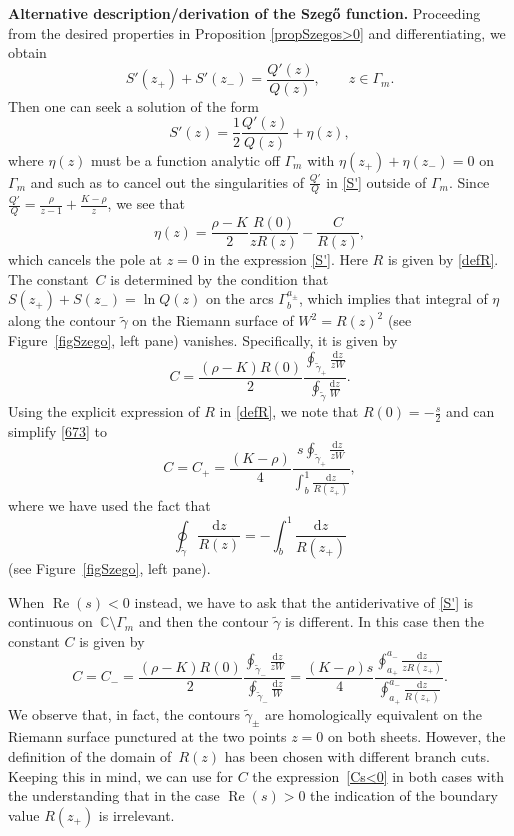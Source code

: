 \documentclass[pdftex]{sigma}
\numberwithin{equation}{section}
\theoremstyle{definition}
\def \wt{ \widetilde }
\def \d{{\mathrm d}}
\def\be{\begin{equation}}
\def\ee{\end{equation}}
\def\C{{\mathbb C}}
\def \Re{\operatorname{Re} }
\def\la{\label}
\begin{document}
{\bf Alternative description/derivation of the Szeg\H{o} function.}
Proceeding from the desired properties in Proposition \eqref{propSzegos>0} and differentiating, we obtain
\[
S'(z_+)+S'(z_-) = \frac {Q'(z)}{Q(z)}, \qquad z\in \Gamma_m.
\]
Then one can seek a solution of the form
\be
\label{S'}
S'(z)=\frac 1 2 \frac {Q'(z)}{Q(z)} + \eta(z),
\ee
where $\eta(z)$ must be a function analytic off $\Gamma_m$ with $\eta(z_+)+ \eta(z_-)= 0$ on $\Gamma_m$ and such as to cancel out the singularities of $\frac {Q'}Q$ in \eqref{S'} outside of $\Gamma_m$.
Since $\frac {Q'}Q = \frac { {\rho}}{z-1} + \frac{ {K} - {\rho}} z$, we see that
\[
\eta(z) = \frac { {\rho} - {K}} 2 \frac{R(0)}{z R(z)} - \frac C{R(z)},
\]
which cancels the pole at $z=0$ in the expression \eqref{S'}. Here $R$ is given by \eqref{defR}.
The constant~$C$ is determined by the condition that $S(z_+)+S(z_-)= \ln Q(z)$ on the arcs $\Gamma_{b}^{a_\pm}$, which implies that integral of $\eta$ along the contour $\wt \gamma$ on the Riemann surface of $W^2=R(z)^2$ (see Figure~\ref{figSzego}, left pane) vanishes. Specifically, it is given by
\be
C= \frac {{( {\rho} - {K})} R(0)}2\frac{\oint_{\wt \gamma_+} \frac {\d z}{z W}}{\oint_{\wt \gamma} \frac {\d z}{W}}.
\la{673}
\ee
Using the explicit expression of $R$ in \eqref{defR}, we note that $R(0) = -\frac{s}2$ and can simplify \eqref{673} to
\[
C=C_+= \frac { ( {K} - {\rho})}{4} \frac {s \oint_{\wt \gamma_+} \frac {\d z}{z W} }{\int_b^1 \frac {\d z}{ R(z_+)}},
\]
where we have used the fact that {\samepage
\[
\oint_{\wt \gamma} \frac {\d z}{R(z)} = - \int_{b}^1 \frac {\d z}{R(z_+)}
\] (see Figure~\ref{figSzego}, left pane).}

When $\Re(s)<0$ instead, we have to ask that the antiderivative of \eqref{S'} is continuous on~$\C \setminus \Gamma_m$ and then the contour $\wt \gamma$ is different.
In this case then the constant $C$ is given by
\be
C=C_-= \frac {{ ( {\rho} - {K})} R(0)}2\frac{\oint_{\wt \gamma_-} \frac {\d z}{z W}}{\oint_{\wt \gamma_-} \frac {\d z}{W}}
=\frac {{ ( {K} - {\rho})} s }4\frac{\oint_{a_+}^{a_-} \frac {\d z}{z R(z_+)}}{\oint_{a_+}^{a_-} \frac {\d z}{R(z_+)}}.\label{Cs<0}
\ee
We observe that, in fact, the contours $\wt\gamma_\pm$ are homologically equivalent on the Riemann surface punctured at the two points $z=0$ on both sheets. However, the definition of the domain of~$R(z)$ has been chosen with different branch cuts. Keeping this in mind, we can use for $C$ the expression~\eqref{Cs<0} in both cases with the understanding that in the case $\Re (s)>0$ the indication of the boundary value $R(z_+)$ is irrelevant.
\end{document}
